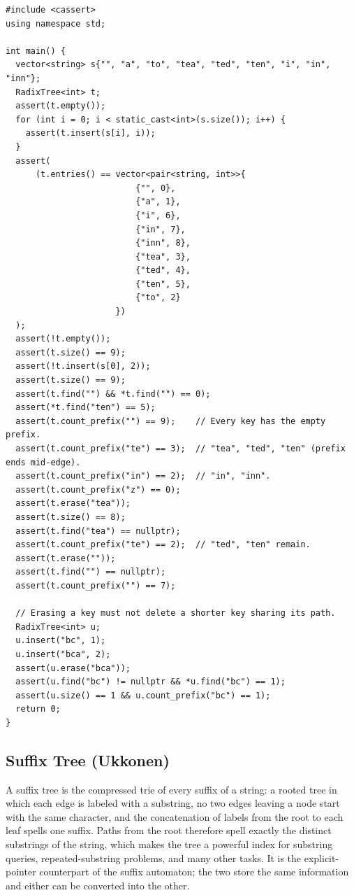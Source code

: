 \begin{lstlisting}[style=cpp]
#include <cassert>
using namespace std;

int main() {
  vector<string> s{"", "a", "to", "tea", "ted", "ten", "i", "in", "inn"};
  RadixTree<int> t;
  assert(t.empty());
  for (int i = 0; i < static_cast<int>(s.size()); i++) {
    assert(t.insert(s[i], i));
  }
  assert(
      (t.entries() == vector<pair<string, int>>{
                          {"", 0},
                          {"a", 1},
                          {"i", 6},
                          {"in", 7},
                          {"inn", 8},
                          {"tea", 3},
                          {"ted", 4},
                          {"ten", 5},
                          {"to", 2}
                      })
  );
  assert(!t.empty());
  assert(t.size() == 9);
  assert(!t.insert(s[0], 2));
  assert(t.size() == 9);
  assert(t.find("") && *t.find("") == 0);
  assert(*t.find("ten") == 5);
  assert(t.count_prefix("") == 9);    // Every key has the empty prefix.
  assert(t.count_prefix("te") == 3);  // "tea", "ted", "ten" (prefix ends mid-edge).
  assert(t.count_prefix("in") == 2);  // "in", "inn".
  assert(t.count_prefix("z") == 0);
  assert(t.erase("tea"));
  assert(t.size() == 8);
  assert(t.find("tea") == nullptr);
  assert(t.count_prefix("te") == 2);  // "ted", "ten" remain.
  assert(t.erase(""));
  assert(t.find("") == nullptr);
  assert(t.count_prefix("") == 7);

  // Erasing a key must not delete a shorter key sharing its path.
  RadixTree<int> u;
  u.insert("bc", 1);
  u.insert("bca", 2);
  assert(u.erase("bca"));
  assert(u.find("bc") != nullptr && *u.find("bc") == 1);
  assert(u.size() == 1 && u.count_prefix("bc") == 1);
  return 0;
}
\end{lstlisting}
\subsection{Suffix Tree (Ukkonen)}
\label{sec:3.5.3}
A suffix tree is the compressed trie of every suffix of a string: a rooted tree in which each edge is labeled with a substring, no two edges leaving a node start with the same character, and the concatenation of labels from the root to each leaf spells one suffix. Paths from the root therefore spell exactly the distinct substrings of the string, which makes the tree a powerful index for substring queries, repeated-substring problems, and many other tasks. It is the explicit-pointer counterpart of the suffix automaton; the two store the same information and either can be converted into the other.

